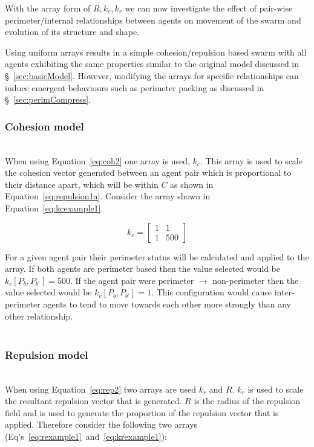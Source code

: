 \documentclass[12pt,a4paper]{IEEEtran}
\newcommand{\kc}{\mathit{k_{c}}}
\newcommand{\kr}{\mathit{k_{r}}}
\newcommand{\rb}{\mathit{R}}
\begin{document}
With the array form of $\rb, \kc, \kr$ we can now investigate the effect of pair-wise perimeter/internal relationships between agents on movement of the swarm and evolution of its structure and shape.

Using uniform arrays results in a simple cohesion/repulsion based swarm with all agents exhibiting the same properties similar to the original model discussed in \S~\ref{sec:basicModel}. However, modifying the arrays for specific relationships can induce emergent behaviours such as perimeter packing as discussed in \S~\ref{sec:perimCompress}.

\subsubsection{Cohesion model}~\\
When using Equation~\ref{eq:coh2} one array is used, $k_c$. This array is used to scale the cohesion vector generated between an agent pair which is proportional to their distance apart, which will be within $C$ as shown in Equation~\ref{eq:repulsion1a}. Consider the array shown in Equation~\ref{eq:kcexample1}.

\begin{equation}\label{eq:kcexample1}
	\kc = 
	\begin{bmatrix}
	1 & 1\\
	1 & 500
	\end{bmatrix}
\end{equation}

For a given agent pair their perimeter status will be calculated and applied to the array. If both agents are perimeter based then the value selected would be $k_c[P_b,P_{b'}] = 500$. If the agent pair were perimeter $\rightarrow$ non-perimeter then the value selected would be $k_c[P_b,P_{b'}] = 1$. This configuration would cause inter-perimeter agents to tend to move towards each other more strongly than any other relationship.\\~

\subsubsection{Repulsion model}~\\
When using Equation~\ref{eq:rep2} two arrays are used $\kr$ and $\rb$. $\kr$ is used to scale the resultant repulsion vector that is generated. $\rb$ is the radius of the repulsion field and is used to generate the proportion of the repulsion vector that is applied. Therefore consider the following two arrays (Eq's~\ref{eq:rexample1}~and~\ref{eq:krexample1}):
\end{document}
